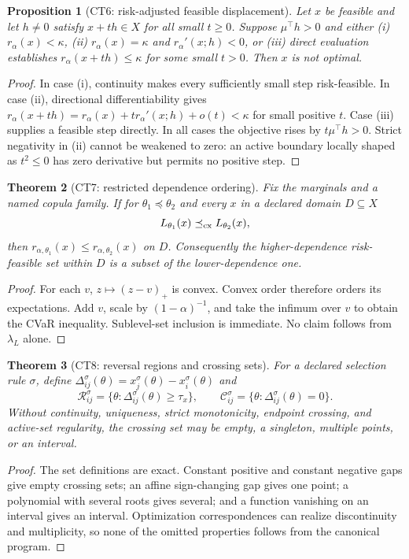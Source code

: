 \documentclass[11pt]{article}
\newtheorem{theorem}{Theorem}
\newtheorem{proposition}[theorem]{Proposition}
\theoremstyle{definition}
\begin{document}
\begin{proposition}[CT6: risk-adjusted feasible displacement]\label{ct6}
Let $x$ be feasible and let $h\ne0$ satisfy $x+th\in X$ for all small
$t\ge0$.  Suppose $\mu^\top h>0$ and either (i) $r_\alpha(x)<\kappa$,
(ii) $r_\alpha(x)=\kappa$ and $r_\alpha'(x;h)<0$, or (iii) direct
evaluation establishes $r_\alpha(x+th)\le\kappa$ for some small $t>0$.
Then $x$ is not optimal.
\end{proposition}
\begin{proof}
In case (i), continuity makes every sufficiently small step risk-feasible.
In case (ii), directional differentiability gives
$r_\alpha(x+th)=r_\alpha(x)+t r_\alpha'(x;h)+o(t)<\kappa$ for small
positive $t$.  Case (iii) supplies a feasible step directly.  In all cases
the objective rises by $t\mu^\top h>0$.  Strict negativity in (ii) cannot
be weakened to zero: an active boundary locally shaped as $t^2\le0$ has
zero derivative but permits no positive step.
\end{proof}

\begin{theorem}[CT7: restricted dependence ordering]\label{ct7}
Fix the marginals and a named copula family.  If for
$\theta_1\preceq\theta_2$ and every $x$ in a declared domain $D\subseteq X$
\[
L_{\theta_1}(x)\preceq_{\rm cx}L_{\theta_2}(x),
\]
then $r_{\alpha,\theta_1}(x)\le r_{\alpha,\theta_2}(x)$ on $D$.
Consequently the higher-dependence risk-feasible set within $D$ is a
subset of the lower-dependence one.
\end{theorem}
\begin{proof}
For each $v$, $z\mapsto(z-v)_+$ is convex.  Convex order therefore orders
its expectations.  Add $v$, scale by $(1-\alpha)^{-1}$, and take the
infimum over $v$ to obtain the CVaR inequality.  Sublevel-set inclusion is
immediate.  No claim follows from $\lambda_L$ alone.
\end{proof}

\begin{theorem}[CT8: reversal regions and crossing sets]\label{ct8}
For a declared selection rule $\sigma$, define
$\Delta^\sigma_{ij}(\theta)=x^\sigma_j(\theta)-x^\sigma_i(\theta)$ and
\[
\mathcal R^\sigma_{ij}=\{\theta:\Delta^\sigma_{ij}(\theta)\ge\tau_x\},
\qquad
\mathcal C^\sigma_{ij}=\{\theta:\Delta^\sigma_{ij}(\theta)=0\}.
\]
Without continuity, uniqueness, strict monotonicity, endpoint crossing,
and active-set regularity, the crossing set may be empty, a singleton,
multiple points, or an interval.
\end{theorem}
\begin{proof}
The set definitions are exact.  Constant positive and constant negative
gaps give empty crossing sets; an affine sign-changing gap gives one point;
a polynomial with several roots gives several; and a function vanishing on
an interval gives an interval.  Optimization correspondences can realize
discontinuity and multiplicity, so none of the omitted properties follows
from the canonical program.
\end{proof}
\end{document}

